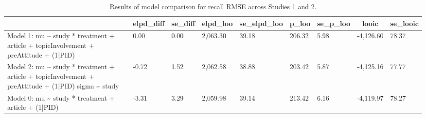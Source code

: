 


\begin{table}[tbp]

\begin{center}
\begin{threeparttable}

\caption{Results of model comparison for recall RMSE across Studies 1 and 2.}

\begin{tabular}{lllllllll}
\toprule
 & \multicolumn{1}{c}{elpd\_diff} & \multicolumn{1}{c}{se\_diff} & \multicolumn{1}{c}{elpd\_loo} & \multicolumn{1}{c}{se\_elpd\_loo} & \multicolumn{1}{c}{p\_loo} & \multicolumn{1}{c}{se\_p\_loo} & \multicolumn{1}{c}{looic} & \multicolumn{1}{c}{se\_looic}\\
\midrule
Model 1: mu \textasciitilde{} study * treatment + article + topicInvolvement + preAttitude + (1|PID) & 0.00 & 0.00 & 2,063.30 & 39.18 & 206.32 & 5.98 & -4,126.60 & 78.37\\
Model 2: mu \textasciitilde{} study * treatment + article + topicInvolvement + preAttitude + (1|PID)
sigma \textasciitilde{} study & -0.72 & 1.52 & 2,062.58 & 38.88 & 203.42 & 5.87 & -4,125.16 & 77.77\\
Model 0: mu \textasciitilde{} study * treatment + article + (1|PID) & -3.31 & 3.29 & 2,059.98 & 39.14 & 213.42 & 6.16 & -4,119.97 & 78.27\\
\bottomrule
\end{tabular}

\end{threeparttable}
\end{center}

\end{table}



